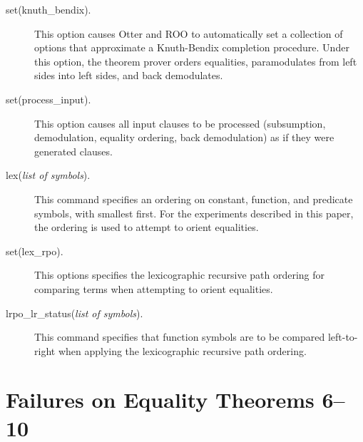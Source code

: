 \begin{description}
\item[set(knuth\_bendix).] 
This option causes Otter and ROO to automatically set a collection of
options that approximate a Knuth-Bendix completion procedure.  Under
this option, the theorem prover orders equalities, paramodulates from left
sides into left sides, and back demodulates.

\item[set(process\_input).]
This option causes all input clauses to be processed (subsumption,
demodulation, equality ordering, back demodulation) as if they
were generated clauses.

\item[lex({\it list of symbols}).]
This command specifies an ordering on constant, function, and
predicate symbols, with smallest first.  For the experiments described
in this paper, the ordering is used to attempt to orient equalities.

\item[set(lex\_rpo).]

This options specifies the lexicographic recursive path ordering for
comparing terms when attempting to orient equalities.

\item[lrpo\_lr\_status({\it list of symbols}).]

This command specifies that function symbols are to be compared
left-to-right when applying the lexicographic recursive path ordering.

\end{description}

\section{Failures on Equality Theorems 6--10}


